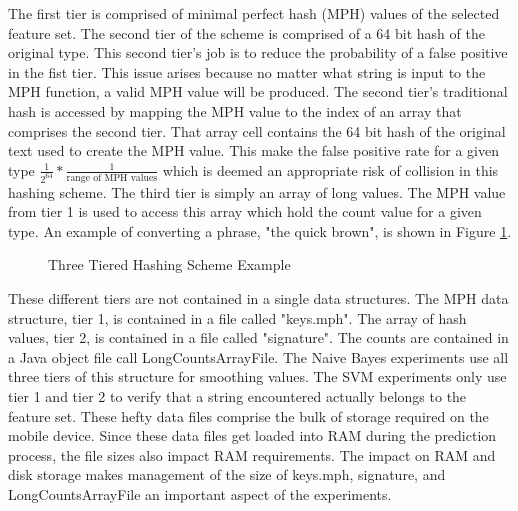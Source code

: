 		The first tier is comprised of minimal perfect hash (MPH) values of the selected feature set.  The second tier of the scheme is comprised of a 64 bit hash of the original type.  This second tier's job is to reduce the probability of a false positive in the fist tier.  This issue arises because no matter what string is input to the MPH function, a valid MPH value will be produced.  The second tier's traditional hash is accessed by mapping the MPH value to the index of an array that comprises the second tier.  That array cell contains the 64 bit hash of the original text used to create the MPH value.  This make the false positive rate for a given type $\frac{1}{2^{64}} * \frac{1}{\text{range of MPH values}}$ which is deemed an appropriate risk of collision in this hashing scheme.  The third tier is simply an array of long values.  The MPH value from tier 1 is used to access this array which hold the count value for a given type.  An example of converting a phrase, "the quick brown", is shown in Figure \ref{fig:3tierHashExample}. 
		
		\begin{figure}[h!]
			\begin{center}
				\caption{Three Tiered Hashing Scheme Example}
				\label{fig:3tierHashExample}
			\end{center}
		\end{figure}
		
		These different tiers are not contained in a single data structures.  The MPH data structure, tier 1, is contained in a file called "keys.mph".  The array of hash values, tier 2, is contained in a file called "signature".  The counts are contained in a Java object file call LongCountsArrayFile.  The Naive Bayes experiments use all three tiers of this structure for smoothing values.  The SVM experiments only use tier 1 and tier 2 to verify that a string encountered actually belongs to the feature set.  These hefty data files comprise the bulk of storage required on the mobile device.  Since these data files get loaded into RAM during the prediction process, the file sizes also impact RAM requirements. The impact on RAM and disk storage makes management of the size of keys.mph, signature, and LongCountsArrayFile an important aspect of the experiments.

